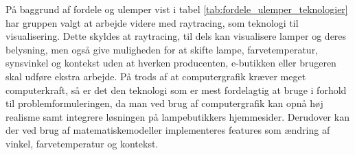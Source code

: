 På baggrund af fordele og ulemper vist i tabel \ref{tab:fordele_ulemper_teknologier} har gruppen valgt at arbejde videre med raytracing, som teknologi til visualisering. Dette skyldes at raytracing, til dels kan visualisere lamper og deres belysning, men også give muligheden for at skifte lampe,  farvetemperatur, synsvinkel og kontekst uden at hverken producenten, e-butikken eller brugeren skal udføre ekstra arbejde. På trods af at computergrafik kræver meget computerkraft, så er det den teknologi som er mest fordelagtig at bruge i forhold til problemformuleringen, da man ved brug af computergrafik kan opnå høj realisme samt integrere løsningen på lampebutikkers hjemmesider. Derudover kan der ved brug af matematiskemodeller implementeres features som ændring af vinkel, farvetemperatur og kontekst. 
